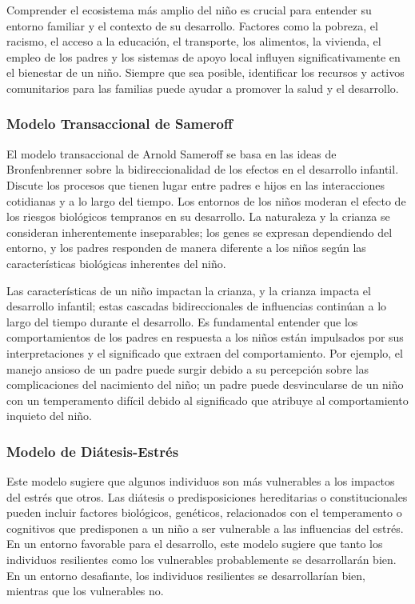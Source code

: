 \documentclass[11pt,letterpaper]{report}
\begin{document}
Comprender el ecosistema más amplio del niño es crucial para entender su 
entorno familiar y el contexto de su desarrollo. Factores como la pobreza, el 
racismo, el acceso a la educación, el transporte, los alimentos, la vivienda,
el empleo de los padres y los sistemas de apoyo local influyen
significativamente en el bienestar de un niño. Siempre que sea posible, 
identificar los recursos y activos comunitarios para las familias puede ayudar 
a promover la salud y el desarrollo. \cite{Nelson19}

\subsubsection{Modelo Transaccional de Sameroff}
El modelo transaccional de Arnold Sameroff se basa en las ideas de
Bronfenbrenner sobre la bidireccionalidad de los efectos en el desarrollo
infantil. Discute los procesos que tienen lugar entre padres e hijos en las
interacciones cotidianas y a lo largo del tiempo. Los entornos de los niños
moderan el efecto de los riesgos biológicos tempranos en su desarrollo. La
naturaleza y la crianza se consideran inherentemente inseparables; los genes se
expresan dependiendo del entorno, y los padres responden de manera diferente a
los niños según las características biológicas inherentes del niño.
\cite{Feldman3}

Las características de un niño impactan la crianza, y la crianza impacta el
desarrollo infantil; estas cascadas bidireccionales de influencias continúan a
lo largo del tiempo durante el desarrollo. Es fundamental entender que los
comportamientos de los padres en respuesta a los niños están impulsados por
sus interpretaciones y el significado que extraen del comportamiento. Por
ejemplo, el manejo ansioso de un padre puede surgir debido a su percepción
sobre las complicaciones del nacimiento del niño; un padre puede desvincularse
de un niño con un temperamento difícil debido al significado que atribuye al
comportamiento inquieto del niño. \cite{Sameroff2009}

\subsubsection{Modelo de Diátesis-Estrés}
Este modelo sugiere que algunos individuos son más vulnerables a los impactos
del estrés que otros. Las diátesis o predisposiciones hereditarias o
constitucionales pueden incluir factores biológicos, genéticos, relacionados
con el temperamento o cognitivos que predisponen a un niño a ser vulnerable a
las influencias del estrés. En un entorno favorable para el desarrollo, este
modelo sugiere que tanto los individuos resilientes como los vulnerables
probablemente se desarrollarán bien. En un entorno desafiante, los individuos
resilientes se desarrollarían bien, mientras que los vulnerables no.
\cite{Feldman3}
\end{document}
